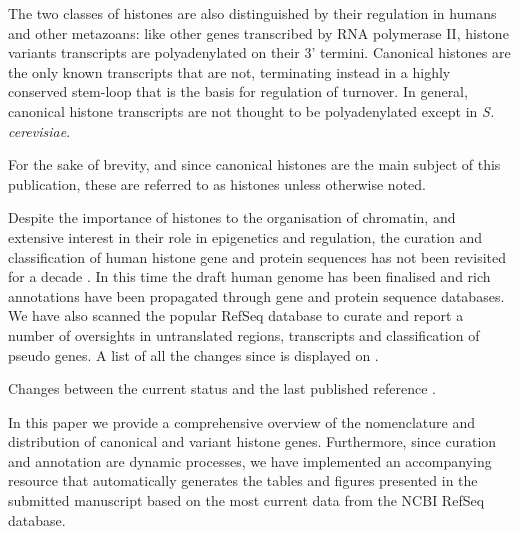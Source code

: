 \documentclass[10pt,a4paper,onecolumn,article]{memoir}
\begin{document}
    The two classes of histones are also distinguished by their regulation in humans and other
    metazoans: like other genes transcribed by RNA polymerase II,  histone variants transcripts
    are polyadenylated on their 3' termini. Canonical histones are the only known transcripts
    that are not, terminating instead in a highly conserved stem-loop that is the basis for
    regulation of turnover. In general, canonical histone transcripts are not thought to be
    polyadenylated except in \textit{S. cerevisiae}.

    For the sake of brevity, and since canonical histones are the main subject of this
    publication, these are referred to as histones unless otherwise noted.

    Despite the importance of histones to the organisation of chromatin, and extensive interest
    in their role in epigenetics and regulation, the curation and classification of human histone
    gene and protein sequences has not been revisited for a decade \citep{Marzluff02}. In this time
    the draft human genome has been finalised and rich annotations have been propagated through
    gene and protein sequence databases. We have also scanned the popular RefSeq
    database to curate and report a number of oversights in untranslated regions, transcripts and
    classification of pseudo genes. A list of all the changes since \cite{Marzluff02} is 
    displayed on .

    \begin{table}
      \caption{Changes between the current status and the last published reference \citep{Marzluff02}.}
      \label{tab:difference-from-Marzluff02}
      \centering
      
    \end{table}

    In this paper we provide a comprehensive overview of the nomenclature and distribution
    of canonical and variant histone genes. Furthermore, since curation and annotation are
    dynamic processes, we have implemented an accompanying resource that automatically generates
    the tables and figures presented in the submitted manuscript based
    on the most current data from the NCBI RefSeq database.


\end{document}
